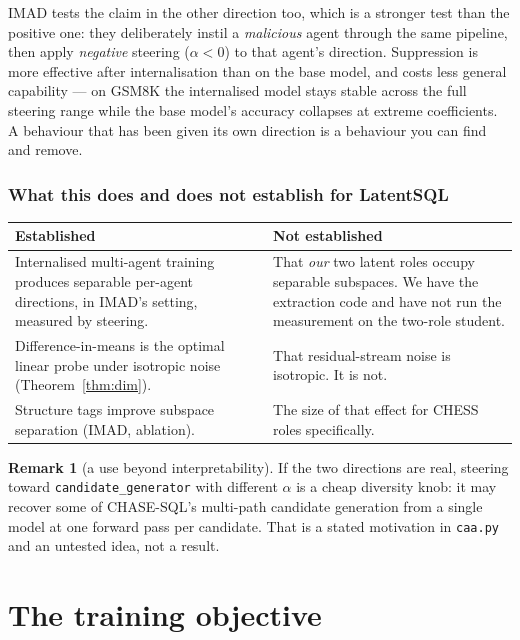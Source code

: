 \documentclass[11pt]{article}
\theoremstyle{definition}
\newtheorem{remark}[theorem]{Remark}
\begin{document}
IMAD tests the claim in the other direction too, which is a stronger test than the positive one: they deliberately instil a \emph{malicious} agent through the same pipeline, then apply \emph{negative} steering ($\alpha<0$) to that agent's direction. Suppression is more effective after internalisation than on the base model, and costs less general capability --- on GSM8K the internalised model stays stable across the full steering range while the base model's accuracy collapses at extreme coefficients. A behaviour that has been given its own direction is a behaviour you can find and remove.

\section{What this does and does not establish for LatentSQL}

\begin{center}
\begin{tabular}{p{}p{}}
\toprule
\textbf{Established} & \textbf{Not established} \\
\midrule
Internalised multi-agent training produces separable per-agent directions, in
IMAD's setting, measured by steering.
& That \emph{our} two latent roles occupy separable subspaces. We
have the extraction code and have not run the measurement on the two-role
student. \\[6pt]
Difference-in-means is the optimal linear probe under isotropic noise
(Theorem~\ref{thm:dim}).
& That residual-stream noise is isotropic. It is not. \\[6pt]
Structure tags improve subspace separation (IMAD, ablation).
& The size of that effect for CHESS roles specifically. \\
\bottomrule
\end{tabular}
\end{center}

\begin{remark}[a use beyond interpretability]
If the two directions are real, steering toward \texttt{candidate\_generator} with different $\alpha$ is a cheap diversity knob: it may recover some of CHASE-SQL's multi-path candidate generation from a single model at one forward pass per candidate. That is a stated motivation in \texttt{caa.py} and an untested idea, not a result.
\end{remark}

\newpage
\part{The training objective}
\label{part:objective}
\end{document}
